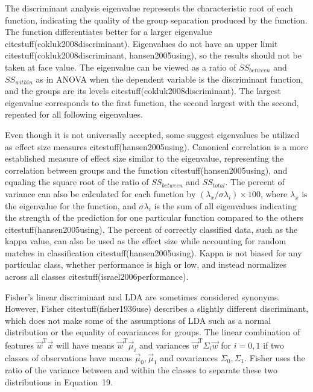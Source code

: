 \documentclass[preprint,12pt]{elsarticle}
\begin{document}
The discriminant analysis eigenvalue represents the characteristic root of each function, indicating the quality of the group separation produced by the function. The function differentiates better for a larger eigenvalue citestuff(cokluk2008discriminant). Eigenvalues do not have an upper limit citestuff(cokluk2008discriminant, hansen2005using), so the results should not be taken at face value. The eigenvalue can be viewed as a ratio of $SS_{between}$ and $SS_{within}$ as in ANOVA when the dependent variable is the discriminant function, and the groups are its levels citestuff(cokluk2008discriminant). The largest eigenvalue corresponds to the first function, the second largest with the second, repeated for all following eigenvalues.

Even though it is not universally accepted, some suggest eigenvalues be utilized as effect size measures citestuff(hansen2005using). Canonical correlation is a more established measure of effect size similar to the eigenvalue, representing the correlation between groups and the function citestuff(hansen2005using), and equaling the square root of the ratio of $SS_{between}$ and $SS_{total}$. The percent of variance can also be calculated for each function by $(\lambda_{x}/\sigma\lambda_{i}) \times 100$, where $\lambda_{x}$ is the eigenvalue for the function, and $\sigma\lambda_{i}$ is the sum of all eigenvalues indicating the strength of the prediction for one particular function compared to the others citestuff(hansen2005using). The percent of correctly classified data, such as the kappa value, can also be used as the effect size while accounting for random matches in classification citestuff(hansen2005using). Kappa is not biased for any particular class, whether performance is high or low, and instead normalizes across all classes citestuff(israel2006performance). 

Fisher's linear discriminant and LDA are sometimes considered synonyms. However, Fisher citestuff(fisher1936use) describes a slightly different discriminant, which does not make some of the assumptions of LDA such as a normal distribution or the equality of covariances for groups. The linear combination of features ${\vec{w}}^{\mathrm{T}}{\vec{x}}$ will have means ${\vec{w}}^{\mathrm{T}}{\vec{\mu}}_{i}$ and variances ${\vec{w}}^{\mathrm{T}}\Sigma_{i}{\vec{w}}$ for $i=0,1$ if two classes of observations have means ${\vec{\mu}}_{0},{\vec{\mu}}_{1}$ and covariances $\Sigma_{0},\Sigma_{1}$. Fisher uses the ratio of the variance between and within the classes to separate these two distributions in Equation~19.
\end{document}
